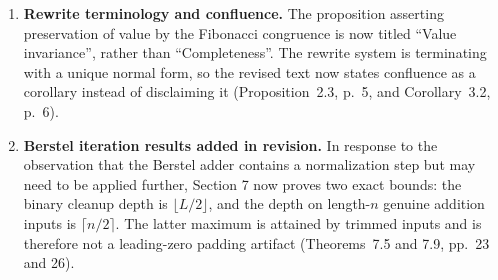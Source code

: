 \documentclass[11pt]{article}
\begin{document}
\begin{enumerate}[leftmargin=*]
\item \textbf{Rewrite terminology and confluence.}
The proposition asserting preservation of value by the Fibonacci congruence
is now titled ``Value invariance'', rather than ``Completeness''.  The rewrite
system is terminating with a unique normal form, so the revised text now
states confluence as a corollary instead of disclaiming it
(Proposition~2.3, p.~5, and Corollary~3.2, p.~6).

\item \textbf{Berstel iteration results added in revision.}
In response to the observation that the Berstel adder contains a normalization
step but may need to be applied further, Section 7 now proves two exact bounds:
the binary cleanup depth is $\lfloor L/2\rfloor$, and the depth on length-$n$
genuine addition inputs is $\lceil n/2\rceil$.  The latter maximum is attained
by trimmed inputs and is therefore not a leading-zero padding artifact
(Theorems~7.5 and 7.9, pp.~23 and 26).
\end{enumerate}
\end{document}
